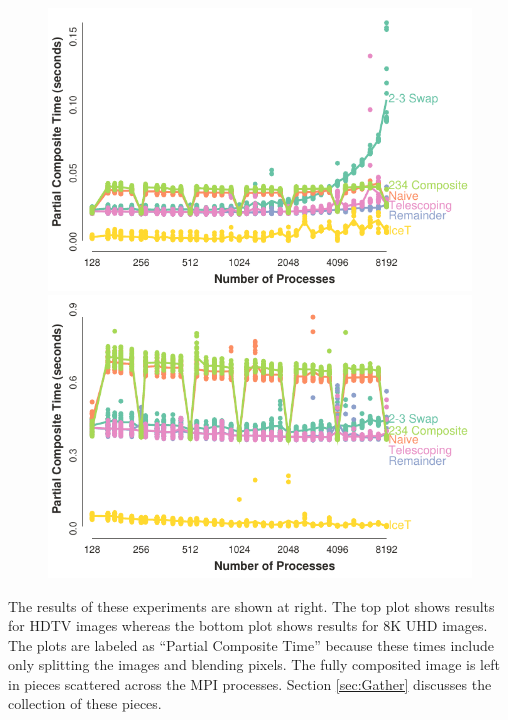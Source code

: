 \documentclass{vgtc}                          %
\newcommand*{\textalgorithm}[1]{\textsf{#1}\xspace}
\newcommand{\binaryswap}{\textalgorithm{binary swap}}
\begin{document}
\begin{figure}
  \includegraphics[width=\linewidth]{scaling-hdtv}
  \includegraphics[width=\linewidth]{scaling-8k}
\end{figure}
The results of these experiments are shown at right.
The top plot shows results for HDTV images whereas the bottom plot shows results for 8K UHD images.
The plots are labeled as ``Partial Composite Time'' because these times include only splitting the images and blending pixels.
The fully composited image is left in pieces scattered across the MPI processes.
Section \ref{sec:Gather} discusses the collection of these pieces.
\end{document}
